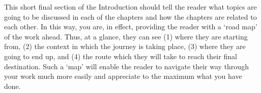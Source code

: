 This short final section of the Introduction should tell the reader what topics are going
to be discussed in each of the chapters and how the chapters are related to each other.
In this way, you are, in effect, providing the reader with a `road map' of the work
ahead. Thus, at a glance, they can see (1) where they are starting from, (2) the context
in which the journey is taking place, (3) where they are going to end up, and (4) the
route which they will take to reach their final destination. Such a `map' will enable
the reader to navigate their way through your work much more easily and appreciate
to the maximum what you have done.
